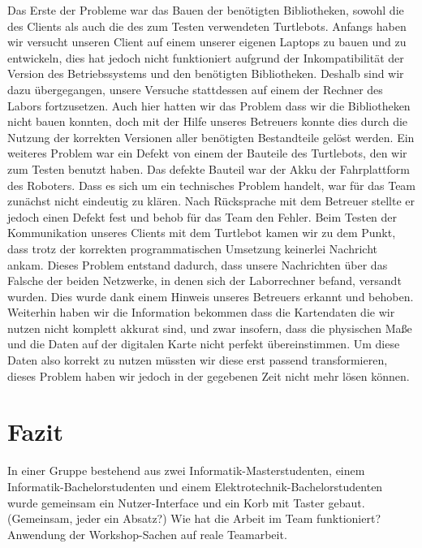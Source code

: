 \documentclass[a4paper,12pt,headsepline]{scrartcl}
\begin{document}
Das Erste der Probleme war das Bauen der benötigten Bibliotheken, sowohl die des Clients als auch die des zum Testen verwendeten Turtlebots. Anfangs haben wir versucht unseren Client auf einem unserer eigenen Laptops zu bauen und zu entwickeln, dies hat jedoch nicht funktioniert aufgrund der Inkompatibilität der Version des Betriebssystems und den benötigten Bibliotheken. Deshalb sind wir dazu übergegangen, unsere Versuche stattdessen auf einem der Rechner des Labors fortzusetzen. Auch hier hatten wir das Problem dass wir die Bibliotheken nicht bauen konnten, doch mit der Hilfe unseres Betreuers konnte dies durch die Nutzung der korrekten Versionen aller benötigten Bestandteile gelöst werden. Ein weiteres Problem war ein Defekt von einem der Bauteile des Turtlebots, den wir zum Testen benutzt haben. Das defekte Bauteil war der Akku der Fahrplattform des Roboters. Dass es sich um ein technisches Problem handelt, war für das Team zunächst nicht eindeutig zu klären. Nach Rücksprache mit dem Betreuer stellte er jedoch einen Defekt fest und behob für das Team den Fehler. Beim Testen der Kommunikation unseres Clients mit dem Turtlebot kamen wir zu dem Punkt, dass trotz der korrekten programmatischen Umsetzung keinerlei Nachricht ankam. Dieses Problem entstand dadurch, dass unsere Nachrichten über das Falsche der beiden Netzwerke, in denen sich der Laborrechner befand, versandt wurden. Dies wurde dank einem Hinweis unseres Betreuers erkannt und behoben.
Weiterhin haben wir die Information bekommen dass die Kartendaten die wir nutzen nicht komplett akkurat sind, und zwar insofern, dass die physischen Maße und die Daten auf der digitalen Karte nicht perfekt übereinstimmen. Um diese Daten also korrekt zu nutzen müssten wir diese erst passend transformieren, dieses Problem haben wir jedoch in der gegebenen Zeit nicht mehr lösen können.
	\section{Fazit}
		In einer Gruppe bestehend aus zwei Informatik-Masterstudenten, einem Informatik-Bachelorstudenten und einem Elektrotechnik-Bachelorstudenten wurde gemeinsam ein Nutzer-Interface und ein Korb mit Taster gebaut.\\
		(Gemeinsam, jeder ein Absatz?)
		Wie hat die Arbeit im Team funktioniert? Anwendung der Workshop-Sachen auf reale Teamarbeit.
		
		
		
		
	\newpage
\end{document}
